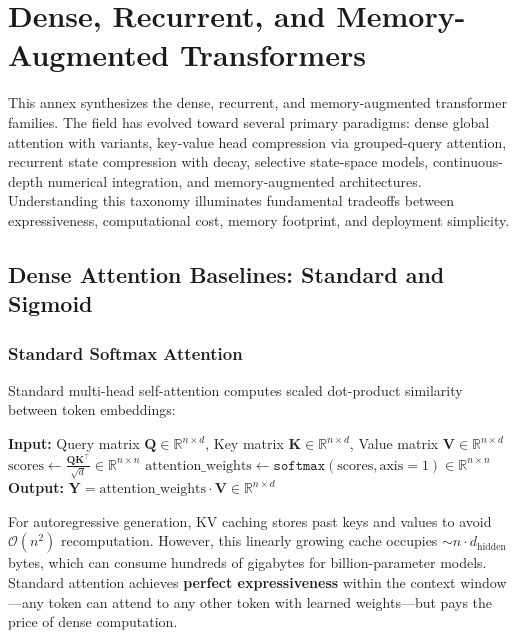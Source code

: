 \section{Dense, Recurrent, and Memory-Augmented Transformers}
\label{sec:annex-transformer}

This annex synthesizes the dense, recurrent, and memory-augmented transformer families. The field has evolved toward several primary paradigms: dense global attention with variants, key-value head compression via grouped-query attention, recurrent state compression with decay, selective state-space models, continuous-depth numerical integration, and memory-augmented architectures. Understanding this taxonomy illuminates fundamental tradeoffs between expressiveness, computational cost, memory footprint, and deployment simplicity.

\subsection{Dense Attention Baselines: Standard and Sigmoid}

\subsubsection{Standard Softmax Attention}
Standard multi-head self-attention \citep{vaswani_attention_2017} computes scaled dot-product similarity between token embeddings:

\begin{algorithmic}[1]
\State \textbf{Input:} Query matrix $\mathbf{Q} \in \mathbb{R}^{n \times d}$, Key matrix $\mathbf{K} \in \mathbb{R}^{n \times d}$, Value matrix $\mathbf{V} \in \mathbb{R}^{n \times d}$
\State $\text{scores} \gets \frac{\mathbf{Q}\mathbf{K}^\top}{\sqrt{d}} \in \mathbb{R}^{n \times n}$ 
\State $\text{attention\_weights} \gets \texttt{softmax}(\text{scores}, \text{axis}=1) \in \mathbb{R}^{n \times n}$ 
\State \textbf{Output:} $\mathbf{Y} = \text{attention\_weights} \cdot \mathbf{V} \in \mathbb{R}^{n \times d}$ 
\end{algorithmic}

For autoregressive generation, KV caching stores past keys and values to avoid $\mathcal{O}(n^2)$ recomputation. However, this linearly growing cache occupies $\sim n \cdot d_{\text{hidden}}$ bytes, which can consume hundreds of gigabytes for billion-parameter models. Standard attention achieves \textbf{perfect expressiveness} within the context window---any token can attend to any other token with learned weights---but pays the price of dense computation.


